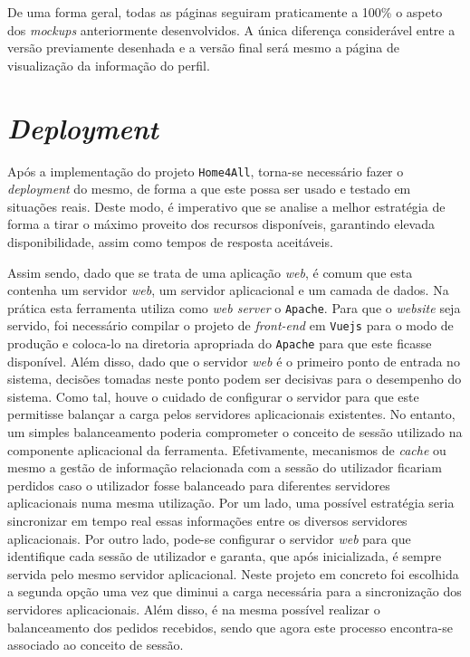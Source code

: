 De uma forma geral, todas as páginas seguiram praticamente a 100\% o aspeto dos \textit{mockups} anteriormente desenvolvidos. A única diferença considerável entre a versão previamente desenhada e a versão final será mesmo a página de visualização da informação do perfil.


\newpage
\section{\textit{Deployment}}

Após a implementação do projeto \texttt{Home4All}, torna-se necessário fazer o \textit{deployment} do mesmo, de forma a que este possa ser usado e testado em situações reais. Deste modo, é imperativo que se analise a melhor estratégia de forma a tirar o máximo proveito dos recursos disponíveis, garantindo elevada disponibilidade, assim como tempos de resposta aceitáveis.

Assim sendo, dado que se trata de uma aplicação \textit{web}, é comum que esta contenha um servidor \textit{web}, um servidor aplicacional e um camada de dados. Na prática esta ferramenta utiliza como \textit{web server} o \texttt{Apache}. Para que o \textit{website} seja servido, foi necessário compilar o projeto de \textit{front-end} em \texttt{Vuejs} para o modo de produção e coloca-lo na diretoria apropriada do \texttt{Apache} para que este ficasse disponível. Além disso, dado que o servidor \textit{web} é o primeiro ponto de entrada no sistema, decisões tomadas neste ponto podem ser decisivas para o desempenho do sistema. Como tal, houve o cuidado de configurar o servidor para que este permitisse balançar a carga pelos servidores aplicacionais existentes. No entanto, um simples balanceamento poderia comprometer o conceito de sessão utilizado na componente aplicacional da ferramenta. Efetivamente, mecanismos de \textit{cache} ou mesmo a gestão de informação relacionada com a sessão do utilizador ficariam perdidos caso o utilizador fosse balanceado para diferentes servidores aplicacionais numa mesma utilização. Por um lado, uma possível estratégia seria sincronizar em tempo real essas informações entre os diversos servidores aplicacionais. Por outro lado, pode-se configurar o servidor \textit{web} para que identifique cada sessão de utilizador e garanta, que após inicializada, é sempre servida pelo mesmo servidor aplicacional. Neste projeto em concreto foi escolhida a segunda opção uma vez que diminui a carga necessária para a sincronização dos servidores aplicacionais. Além disso, é na mesma possível realizar o balanceamento dos pedidos recebidos,  sendo que agora este processo encontra-se associado ao conceito de sessão.

